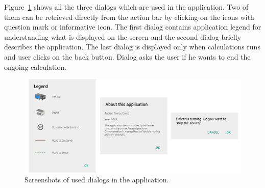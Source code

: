 Figure~\ref{DialogsFigure} shows all the three dialogs which are used in the application. Two of them can be retrieved
directly from the action bar by clicking on the icons with question mark or informative icon. The first dialog contains
application legend for understanding what is displayed on the screen and the second dialog briefly describes the
application. The last dialog is displayed only when calculations runs and user clicks on the back button. Dialog asks
the user if he wants to end the ongoing calculation.

\begin{figure}[h!]
    \centering
    \includegraphics[scale=0.15]{fig/dialogs.png}
    \caption{Screenshots of used dialogs in the application.}
    \label{DialogsFigure}
\end{figure}
